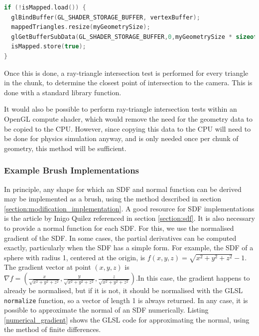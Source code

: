 \documentclass{article}
\begin{document}
\begin{lstlisting}[language=C++,label={mapgeometry},caption={Snippet from the procedure \texttt{mapGeometry} to copy geometry data for a chunk from the GPU to the CPU, to be stored in the array \texttt{mappedTriangles}. \texttt{isMapped} is an atomic boolean storing whether \texttt{mapGeometry} has already been called for this chunk.}]
if (!isMapped.load()) {
  glBindBuffer(GL_SHADER_STORAGE_BUFFER, vertexBuffer);
  mappedTriangles.resize(myGeometrySize);
  glGetBufferSubData(GL_SHADER_STORAGE_BUFFER,0,myGeometrySize * sizeof(glm::vec4),mappedTriangles.data());
  isMapped.store(true);
}
\end{lstlisting}

Once this is done, a ray-triangle intersection test is performed for every triangle in the chunk, to determine the closest point of intersection to the camera. This is done with a standard library function. 

It would also be possible to perform ray-triangle intersection tests within an OpenGL compute shader, which would remove the need for the geometry data to be copied to the CPU. However, since copying this data to the CPU will need to be done for physics simulation anyway, and is only needed once per chunk of geometry, this method will be sufficient.
\subsubsection{Example Brush Implementations}
In principle, any shape for which an SDF and normal function can be derived may be implemented as a brush, using the method described in section \ref{section:modification_implementation}. A good resource for SDF implementations is the article by Inigo Quilez referenced in section \ref{section:sdf}\cite{quilez:sdf}. It is also necessary to provide a normal function for each SDF. For this, we use the normalised gradient of the SDF. In some cases, the partial derivatives can be computed exactly, particularly when the SDF has a simple form. For example, the SDF of a sphere with radius 1, centered at the origin, is $f\left(x,y,z\right) = \sqrt{x^2+y^2+z^2}-1$. The gradient vector at point $\left(x,y,z\right)$ is $\nabla f = \left(\frac{x}{\sqrt{x^2+y^2+z^2}},\frac{y}{\sqrt{x^2+y^2+z^2}},\frac{z}{\sqrt{x^2+y^2+z^2}}\right)$.In this case, the gradient happens to already be normalised, but if it is not, it should be normalised with the GLSL \texttt{normalize} function, so a vector of length 1 is always returned. In any case, it is possible to approximate the normal of an SDF numerically. Listing \ref{numerical_gradient} shows the GLSL code for approximating the normal, using the method of finite differences.
\end{document}
